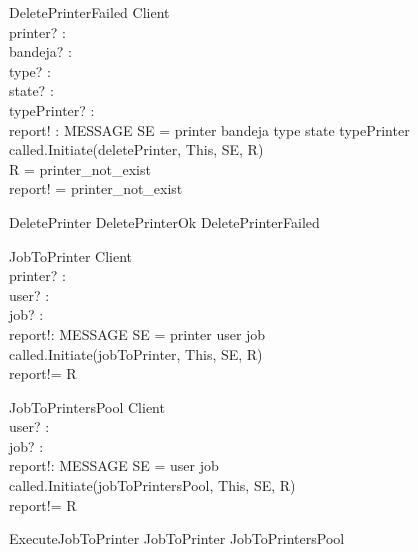 \begin{schema}{DeletePrinterFailed}
\Xi Client \\
printer? : \nat \\
bandeja? : \nat \\
type? : \nat \\
state? : \nat \\
typePrinter? : \nat \\
report! : MESSAGE
\where
SE = \lseq printer bandeja type state typePrinter \rseq \\
called.Initiate(deletePrinter, This, SE, R) \\
R = printer\_not\_exist \\
report! = printer\_not\_exist
\end{schema}

\begin{zed}
DeletePrinter \sdef DeletePrinterOk \lor DeletePrinterFailed \end{zed}


\begin{schema}{JobToPrinter}
\Delta Client \\
printer? : \nat \\
user? : \nat \\
job? : \nat \\
report!: MESSAGE
\where
SE = \lseq printer user job \rseq \\
called.Initiate(jobToPrinter, This, SE, R) \\
report!= R
\end{schema}

\begin{schema}{JobToPrintersPool}
\Delta Client \\
user? : \nat \\
job? : \nat \\
report!: MESSAGE
\where
SE = \lseq user job \rseq \\
called.Initiate(jobToPrintersPool, This, SE, R) \\
report!= R
\end{schema}


\begin{zed}
ExecuteJobToPrinter \sdef JobToPrinter \lor JobToPrintersPool \end{zed}